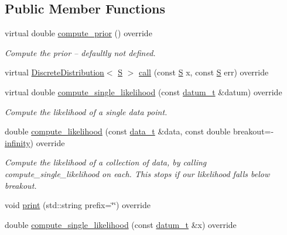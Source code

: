 \subsection*{Public Member Functions}
\begin{DoxyCompactItemize}
\item 
virtual double \hyperlink{class_my_hypothesis_ab092094c5fc31730de4f40609220bb18}{compute\+\_\+prior} () override
\begin{DoxyCompactList}\small\item\em Compute the prior -- defaultly not defined. \end{DoxyCompactList}\item 
virtual \hyperlink{class_discrete_distribution}{Discrete\+Distribution}$<$ \hyperlink{_formal_language_theory-_complex_2_main_8cpp_a51c40915539205f0b5add30b0d68a4cb}{S} $>$ \hyperlink{class_my_hypothesis_a61391d3f1f6fbbe37663b22e2068ac90}{call} (const \hyperlink{_formal_language_theory-_complex_2_main_8cpp_a51c40915539205f0b5add30b0d68a4cb}{S} x, const \hyperlink{_formal_language_theory-_complex_2_main_8cpp_a51c40915539205f0b5add30b0d68a4cb}{S} err) override
\item 
virtual double \hyperlink{class_my_hypothesis_af2470b1e04711c06ee551deae15af4c1}{compute\+\_\+single\+\_\+likelihood} (const \hyperlink{class_bayesable_a9f1a6c0cd7855550fa10b1a8f13a5867}{datum\+\_\+t} \&datum) override
\begin{DoxyCompactList}\small\item\em Compute the likelihood of a single data point. \end{DoxyCompactList}\item 
double \hyperlink{class_my_hypothesis_a42d7d139cd23f30342e1393fd0873dd1}{compute\+\_\+likelihood} (const \hyperlink{class_bayesable_aa2788c4d7718c0a824e1d28c4c98f921}{data\+\_\+t} \&data, const double breakout=-\/\hyperlink{_numerics_8h_a1bb1e42ae1b40cad6e99da0aab8a5576}{infinity}) override
\begin{DoxyCompactList}\small\item\em Compute the likelihood of a collection of data, by calling compute\+\_\+single\+\_\+likelihood on each. This stops if our likelihood falls below breakout. \end{DoxyCompactList}\item 
void \hyperlink{class_my_hypothesis_a91fd22a2724e04c0e7c67ea4282beac4}{print} (std\+::string prefix=\char`\"{}\char`\"{}) override
\item 
double \hyperlink{class_my_hypothesis_af23a45a03a28ea4f42438e70d47acacb}{compute\+\_\+single\+\_\+likelihood} (const \hyperlink{class_bayesable_a9f1a6c0cd7855550fa10b1a8f13a5867}{datum\+\_\+t} \&x) override

\end{DoxyCompactItemize}
